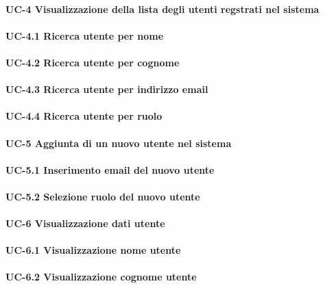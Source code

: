
\paragraph{UC-4 Visualizzazione della lista degli utenti regstrati nel sistema}

    \paragraph{UC-4.1 Ricerca utente per nome}

    \paragraph{UC-4.2 Ricerca utente per cognome}

    \paragraph{UC-4.3 Ricerca utente per indirizzo email}

    \paragraph{UC-4.4 Ricerca utente per ruolo}

\paragraph{UC-5 Aggiunta di un nuovo utente nel sistema}

    \paragraph{UC-5.1 Inserimento email del nuovo utente}

    \paragraph{UC-5.2 Selezione ruolo del nuovo utente}

\paragraph{UC-6 Visualizzazione dati utente}

    \paragraph{UC-6.1 Visualizzazione nome utente}

    \paragraph{UC-6.2 Visualizzazione cognome utente}

